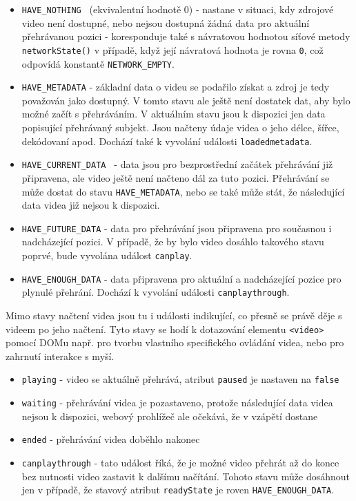 \begin{itemize}
	\item \texttt{HAVE\_NOTHING } (ekvivalentní hodnotě 0) \newline
	 - nastane v situaci, kdy zdrojové video není dostupné, nebo nejsou dostupná žádná data pro aktuální přehrávanou pozici \newline - koresponduje také s návratovou hodnotou síťové metody \texttt{networkState()} v případě, když její návratová hodnota je rovna \texttt{0}, což odpovídá konstantě \texttt{NETWORK\_EMPTY}.
	\item \texttt{HAVE\_METADATA} \newline
		-  základní data o videu se podařilo získat a zdroj je tedy považován jako dostupný. V tomto stavu ale ještě není dostatek dat, aby bylo možné začít s přehráváním. V aktuálním stavu jsou k dispozici jen data popisující přehrávaný subjekt. Jsou načteny údaje videa o jeho délce, šířce, dekódovaní apod. Dochází  také k vyvolání události \texttt{loadedmetadata}.\cite{html5}
	\item \texttt{HAVE\_CURRENT\_DATA }\newline
		- data jsou pro bezprostřední začátek přehrávání již  připravena, ale video ještě není načteno dál za tuto pozici. Přehrávání se může  dostat do stavu \texttt{HAVE\_METADATA}, nebo se také může stát, že  následující data videa již nejsou k dispozici.
	\item \texttt{HAVE\_FUTURE\_DATA}\newline
		- data pro přehrávání jsou připravena pro současnou i nadcházející pozici. V případě, že by bylo video dosáhlo takového stavu poprvé, bude vyvolána událost \texttt{canplay}.
	\item \texttt{HAVE\_ENOUGH\_DATA}\newline
		- data připravena pro aktuální a nadcházející pozice pro plynulé přehrání. Dochází k vyvolání události \texttt{canplaythrough}.
\end{itemize}

Mimo stavy načtení videa jsou tu i události indikující, co přesně se právě děje s videem po jeho načtení. Tyto stavy se hodí k dotazování elementu \texttt{<video>} pomocí DOMu např. pro tvorbu vlastního specifického ovládání videa, nebo pro zahrnutí interakce s myší.



\begin{itemize}
	\item \texttt{playing} - video se aktuálně přehrává, atribut \texttt{paused} je nastaven na \texttt{false}	
	\item \texttt{waiting} - přehrávání videa je pozastaveno, protože následující data videa nejsou k dispozici, webový prohlížeč ale očekává, že v vzápětí dostane
	\item \texttt{ended} - přehrávání videa doběhlo nakonec
	\item \texttt{canplaythrough} - tato událost říká, že je možné video přehrát až do konce bez nutnosti video zastavit k dalšímu načítání. Tohoto stavu může dosáhnout jen v případě, že stavový atribut \texttt{readyState} je roven \texttt{HAVE\_ENOUGH\_DATA}.
	
\end{itemize}

